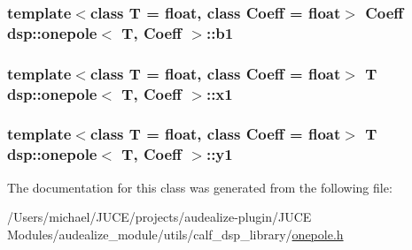 \subsubsection[{\texorpdfstring{b1}{b1}}]{\setlength{\rightskip}{0pt plus 5cm}template$<$class T = float, class Coeff = float$>$ Coeff {\bf dsp\+::onepole}$<$ T, Coeff $>$\+::b1}\hypertarget{classdsp_1_1onepole_afcd7b74b224a81a705f6824df2d55351}{}\label{classdsp_1_1onepole_afcd7b74b224a81a705f6824df2d55351}
\subsubsection[{\texorpdfstring{x1}{x1}}]{\setlength{\rightskip}{0pt plus 5cm}template$<$class T = float, class Coeff = float$>$ T {\bf dsp\+::onepole}$<$ T, Coeff $>$\+::x1}\hypertarget{classdsp_1_1onepole_a43750f73796581da8310aa56fc0914a8}{}\label{classdsp_1_1onepole_a43750f73796581da8310aa56fc0914a8}
\subsubsection[{\texorpdfstring{y1}{y1}}]{\setlength{\rightskip}{0pt plus 5cm}template$<$class T = float, class Coeff = float$>$ T {\bf dsp\+::onepole}$<$ T, Coeff $>$\+::y1}\hypertarget{classdsp_1_1onepole_a4de5f5e37475dfa0b6a3f44827bb1272}{}\label{classdsp_1_1onepole_a4de5f5e37475dfa0b6a3f44827bb1272}


The documentation for this class was generated from the following file\+:\begin{DoxyCompactItemize}
\item 
/\+Users/michael/\+J\+U\+C\+E/projects/audealize-\/plugin/\+J\+U\+C\+E Modules/audealize\+\_\+module/utils/calf\+\_\+dsp\+\_\+library/\hyperlink{onepole_8h}{onepole.\+h}\end{DoxyCompactItemize}
